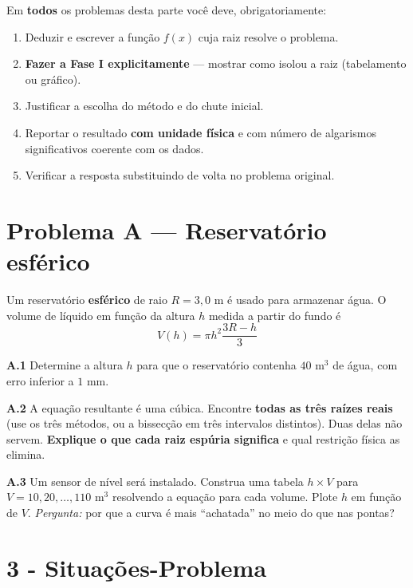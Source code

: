 \documentclass[
	12pt,				%
	openright,			%
	a4paper,			%
	english,			%
	french,				%
	spanish,			%
	brazil,				%
	]{abntex2}
\begin{document}
\begin{tcolorbox}[colback=gray!5!white, colframe=gray!20!white, arc=0mm, boxrule=0.5pt]
Em \textbf{todos} os problemas desta parte você deve, obrigatoriamente:
\begin{enumerate}
    \item Deduzir e escrever a função $f(x)$ cuja raiz resolve o problema.
    \item \textbf{Fazer a Fase I explicitamente} --- mostrar como isolou a raiz (tabelamento ou gráfico).
    \item Justificar a escolha do método e do chute inicial.
    \item Reportar o resultado \textbf{com unidade física} e com número de algarismos significativos coerente com os dados.
    \item Verificar a resposta substituindo de volta no problema original.
\end{enumerate}
\end{tcolorbox}

\section*{Problema A \textnormal{---} Reservatório esférico}

\par Um reservatório \textbf{esférico} de raio $R = 3,0\text{ m}$ é usado para armazenar água. O volume de líquido em função da altura $h$ medida a partir do fundo é
\[
V(h) = \pi h^2 \frac{3R - h}{3}
\]

\textbf{A.1} Determine a altura $h$ para que o reservatório contenha $40\text{ m}^3$ de água, com erro inferior a $1\text{ mm}$.

\textbf{A.2} A equação resultante é uma cúbica. Encontre \textbf{todas as três raízes reais} (use os três métodos, ou a bissecção em três intervalos distintos). Duas delas não servem. \textbf{Explique o que cada raiz espúria significa} e qual restrição física as elimina.

\textbf{A.3} Um sensor de nível será instalado. Construa uma tabela $h \times V$ para $V = 10, 20, \dots, 110\text{ m}^3$ resolvendo a equação para cada volume. Plote $h$ em função de $V$. \textit{Pergunta:} por que a curva é mais ``achatada'' no meio do que nas pontas?

\section*{3 - Situações-Problema}
\end{document}
